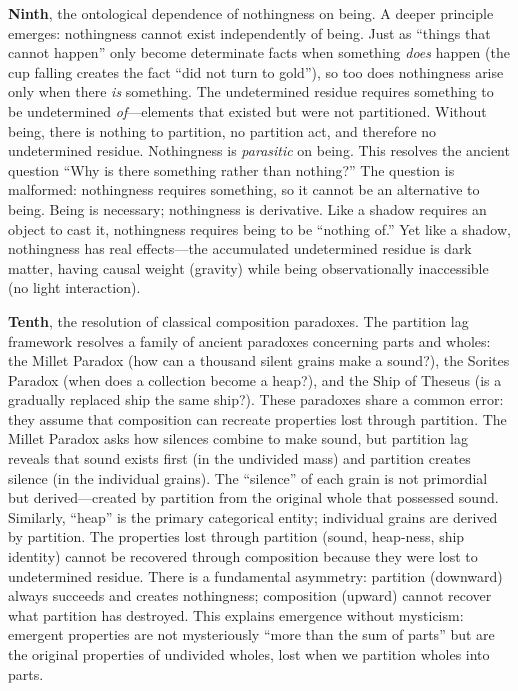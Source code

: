\textbf{Ninth}, the ontological dependence of nothingness on being. A deeper principle emerges: nothingness cannot exist independently of being. Just as ``things that cannot happen'' only become determinate facts when something \emph{does} happen (the cup falling creates the fact ``did not turn to gold''), so too does nothingness arise only when there \emph{is} something. The undetermined residue requires something to be undetermined \emph{of}---elements that existed but were not partitioned. Without being, there is nothing to partition, no partition act, and therefore no undetermined residue. Nothingness is \emph{parasitic} on being. This resolves the ancient question ``Why is there something rather than nothing?'' The question is malformed: nothingness requires something, so it cannot be an alternative to being. Being is necessary; nothingness is derivative. Like a shadow requires an object to cast it, nothingness requires being to be ``nothing of.'' Yet like a shadow, nothingness has real effects---the accumulated undetermined residue is dark matter, having causal weight (gravity) while being observationally inaccessible (no light interaction).

\textbf{Tenth}, the resolution of classical composition paradoxes. The partition lag framework resolves a family of ancient paradoxes concerning parts and wholes: the Millet Paradox (how can a thousand silent grains make a sound?), the Sorites Paradox (when does a collection become a heap?), and the Ship of Theseus (is a gradually replaced ship the same ship?). These paradoxes share a common error: they assume that composition can recreate properties lost through partition. The Millet Paradox asks how silences combine to make sound, but partition lag reveals that sound exists first (in the undivided mass) and partition creates silence (in the individual grains). The ``silence'' of each grain is not primordial but derived---created by partition from the original whole that possessed sound. Similarly, ``heap'' is the primary categorical entity; individual grains are derived by partition. The properties lost through partition (sound, heap-ness, ship identity) cannot be recovered through composition because they were lost to undetermined residue. There is a fundamental asymmetry: partition (downward) always succeeds and creates nothingness; composition (upward) cannot recover what partition has destroyed. This explains emergence without mysticism: emergent properties are not mysteriously ``more than the sum of parts'' but are the original properties of undivided wholes, lost when we partition wholes into parts.

